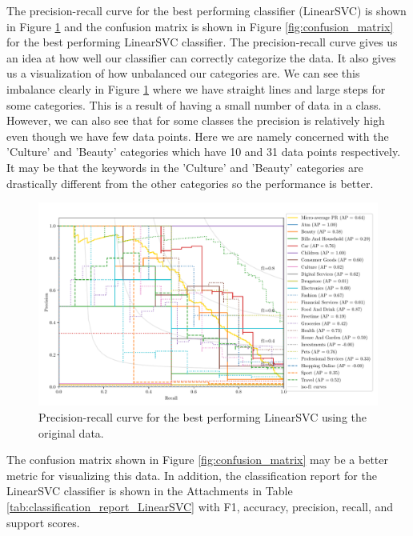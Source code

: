 The precision-recall curve for the best performing classifier (LinearSVC) is shown in Figure \ref{fig:pr_curve} and the confusion matrix is shown in Figure \ref{fig:confusion_matrix} for the best performing LinearSVC classifier. The precision-recall curve gives us an idea at how well our classifier can correctly categorize the data. It also gives us a visualization of how unbalanced our categories are. We can see this imbalance clearly in Figure \ref{fig:pr_curve} where we have straight lines and large steps for some categories. This is a result of having a small number of data in a class. However, we can also see that for some classes the precision is relatively high even though we have few data points. Here we are namely concerned with the 'Culture' and 'Beauty' categories which have 10 and 31 data points respectively. It may be that the keywords in the 'Culture' and 'Beauty' categories are drastically different from the other categories so the performance is better. 

\begin{figure}[ht]
  \centering
  \includegraphics[width=\textwidth]{../img/plot_pr_curve}
  \caption{Precision-recall curve for the best performing LinearSVC using the original data.}
  \label{fig:pr_curve}
\end{figure}

The confusion matrix shown in Figure \ref{fig:confusion_matrix} may be a better metric for visualizing this data. In addition, the classification report for the LinearSVC classifier is shown in the Attachments in Table \ref{tab:classification_report_LinearSVC} with F1, accuracy, precision, recall, and support scores.

